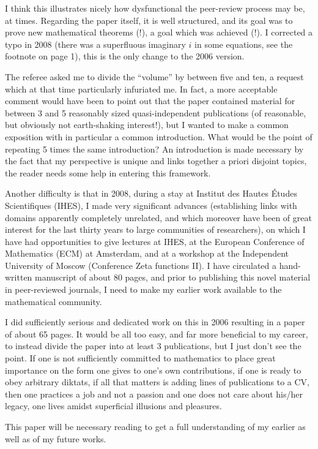 \documentclass[11pt]{article}
\begin{document}
I think this illustrates nicely how dysfunctional the
peer-review process may be, at times. Regarding the paper
itself, it is well structured, and its goal was to prove new
mathematical theorems (!), a goal which was achieved (!). I
corrected a typo in 2008 (there was a superfluous imaginary
$i$ in some equations, see the footnote on page 1), this is
the only change to the 2006 version.

The referee asked me to divide the ``volume'' by between
five and ten, a request which at that time particularly
infuriated me. In fact, a more acceptable comment would have
been to point out that the paper contained material for
between 3 and 5 reasonably sized quasi-independent
publications (of reasonable, but obviously not earth-shaking
interest!), but I wanted to make a common exposition with in
particular a common introduction. What would be the point of
repeating 5 times the same introduction? An introduction is
made necessary by the fact that my perspective is unique and
links together a priori disjoint topics, the reader needs
some help in entering this framework.

Another difficulty is that in 2008, during a stay at Institut des Hautes \'{E}tudes Scientifiques (IHES), I
made very significant advances
(establishing links with domains apparently completely
unrelated, and which moreover have been of great interest
for the last thirty years to large communities of researchers), on
which I have had opportunities to give lectures at IHES, at
the European Conference of Mathematics (ECM) at Amsterdam, and at a workshop at the Independent
University of Moscow (Conference Zeta functions II). I have
circulated a hand-written manuscript of about 80 pages, and
prior to publishing this novel material in peer-reviewed journals,
I need to make my earlier work available to the
mathematical community.

I did sufficiently serious and dedicated work on this in 2006 resulting in a
paper of about 65 pages. It would be all too easy, and far
more beneficial to my career, to instead divide the paper
into at least 3 publications, but I just don't see the
point. If one is not sufficiently committed to mathematics
to place great importance on the form one gives to one's own
contributions, if one is ready to obey
arbitrary diktats, if all that matters is adding lines of
publications to a CV, then one practices a job and not a
passion and one does not care about his/her legacy, one
lives amidst superficial illusions and pleasures.

This paper will be necessary reading to get a full understanding of my
earlier as well as of my future works.
\end{document}
